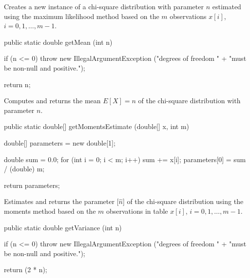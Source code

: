 \begin{tabb}
   Creates a new instance of a chi-square distribution with parameter $n$ estimated using
   the maximum likelihood method based on the $m$ observations $x[i]$,
   $i = 0, 1, \ldots, m-1$.
\end{tabb}
\begin{htmlonly}
\end{htmlonly}
\begin{code}

   public static double getMean (int n)\begin{hide} {
      if (n <= 0)
         throw new IllegalArgumentException ("degrees of freedom " +
                              "must be non-null and positive.");

      return n;
   }\end{hide}
\end{code}
\begin{tabb}  Computes and returns the mean $E[X] = n$ of the
   chi-square distribution with parameter $n$.
\end{tabb}
\begin{htmlonly}
\end{htmlonly}
\begin{code}

   public static double[] getMomentsEstimate (double[] x, int m)\begin{hide} {
      double[] parameters = new double[1];

      double sum = 0.0;
      for (int i = 0; i < m; i++)
         sum += x[i];
      parameters[0] = sum / (double) m;

      return parameters;
   }\end{hide}
\end{code}
\begin{tabb}
   Estimates and returns the parameter [$\hat{n}$] of the chi-square
   distribution using the moments method based on the $m$ observations
   in table $x[i]$, $i = 0, 1, \ldots, m-1$.
\end{tabb}
\begin{htmlonly}
\end{htmlonly}
\begin{code}

   public static double getVariance (int n)\begin{hide} {
      if (n <= 0)
         throw new IllegalArgumentException ("degrees of freedom " +
                              "must be non-null and positive.");

      return (2 * n);
   }\end{hide}
\end{code}

